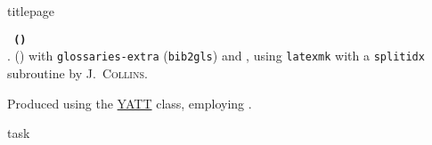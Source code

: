 %
{titlepage}%
\cleardoubleevenpage%
\vspace*{\fill}
\DeclareUrlCommand{}%
{%
%
\thispagestyle{empty}
%
\begin{minipage}{0.5\linewidth}
\label{metadata}

\hypersetup{hidelinks}
\color{g2}

\footnotesize
\raggedright

\noindent\texttt{%
	\bfseries\jobname{}
	\expandafter\EscWrapper\expandafter{\GitVersion}
	(\expandafter\EscWrapper\expandafter{\GitShorthash})
	\censornotice{}
}%
\\[\baselineskip]

\noindent\prettybanner{}.
\hologo{\fmtname} (\fmtversion) with \texttt{glossaries-extra} (\texttt{bib2gls}) and , using \texttt{latexmk} with a \texttt{splitidx} subroutine by J.\ \textsc{Collins}.

Produced using the \href{https://github.com/alexpovel/thesis_template}{YATT} class, employing \KOMAScriptVersion{}.
\end{minipage}
%
}%
\cleardoubleoddpage%
{task}%
\cleardoubleoddpage
\vspace*{\fill}
%
%
